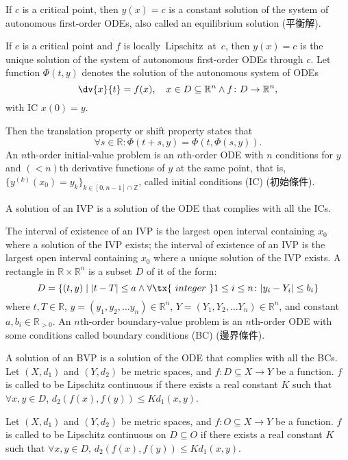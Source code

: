 \documentclass[a4paper,12pt]{report}
\begin{document}
\begin{itemize}
\begin{itemize}
If $c$ is a critical point, then $y(x)=c$ is a constant solution of the system of autonomous first-order ODEs, also called an equilibrium solution (平衡解).

If $c$ is a critical point and $f$ is locally Lipschitz at $c$, then $y(x)=c$ is the unique solution of the system of autonomous first-order ODEs through $c$.
Let function $\Phi(t,y)$ denotes the solution of the autonomous system of ODEs
\[\dv{x}{t}=f(x),\quad x\in D\subseteq\mathbb{R}^n\land f\colon D\to\mathbb{R}^n,\]
with IC $x(0)=y$.

Then the translation property or shift property states that
\[\forall s\in\mathbb{R}\colon\Phi(t+s,y)=\Phi(t,\Phi(s,y)).\]
An $n$th-order initial-value problem is an $n$th-order ODE with $n$ conditions for $y$ and $(<n)$th derivative functions of $y$ at the same point, that is, $\{y^{(k)}(x_0)=y_k\}_{k\in[0,n-1]\cap\mathbb{Z}}$, called initial conditions (IC) (初始條件).

A solution of an IVP is a solution of the ODE that complies with all the ICs.

The interval of existence of an IVP is the largest open interval containing $x_0$ where a solution of the IVP exists; the interval of existence of an IVP is the largest open interval containing $x_0$ where a unique solution of the IVP exists.
A rectangle in $\mathbb{R}\times\mathbb{R}^n$ is a subset $D$ of it of the form:
\[D=\{(t,y)\mid|t-T|\leq a\land\forall\tx{\ integer\ }1\leq i\leq n\colon |y_i-Y_i|\leq b_i\}\]
where $t,T\in\mathbb{R}$, $y=(y_1, y_2,\dots  y_n)\in\mathbb{R}^n$, $Y=(Y_1, Y_2,\dots  Y_n)\in\mathbb{R}^n$, and constant $a,b_i\in\mathbb{R}_{>0}$.
An $n$th-order boundary-value problem is an $n$th-order ODE with some conditions called boundary conditions (BC) (邊界條件).

A solution of an BVP is a solution of the ODE that complies with all the BCs.
Let $(X,d_1)$ and $(Y,d_2)$ be metric spaces, and $f\colon D\subseteq X\to Y$ be a function. $f$ is called to be Lipschitz continuous if there exists a real constant $K$ such that $\forall x,y\in D$, $d_{2}(f(x),f(y))\leq Kd_{1}(x,y)$.

Let $(X,d_1)$ and $(Y,d_2)$ be metric spaces, and $f\colon O\subseteq X\to Y$ be a function. $f$ is called to be Lipschitz continuous on $D\subseteq O$ if there exists a real constant $K$ such that $\forall x,y\in D$, $d_{2}(f(x),f(y))\leq Kd_{1}(x,y)$.


\end{itemize}
\end{itemize}
\end{document}
